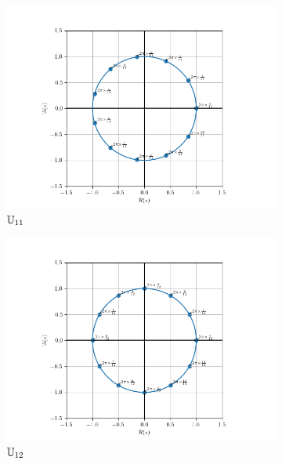 \begin{figure}
\begin{subfigure}{.3\textwidth}
      \includegraphics[scale=.33]{U_11.png}  
      \caption{$\mathbb{U}_{11}$}
      \label{fig:U11}
    \end{subfigure}
    \newline
    \begin{subfigure}{.3\textwidth}
      \centering
      \includegraphics[scale=.33]{U_12.png}  
      \caption{$\mathbb{U}_{12}$}
      \label{fig:U12}      
    \end{subfigure}
    \begin{subfigure}{.3\textwidth}
      \centering

\end{subfigure}
\end{figure}
